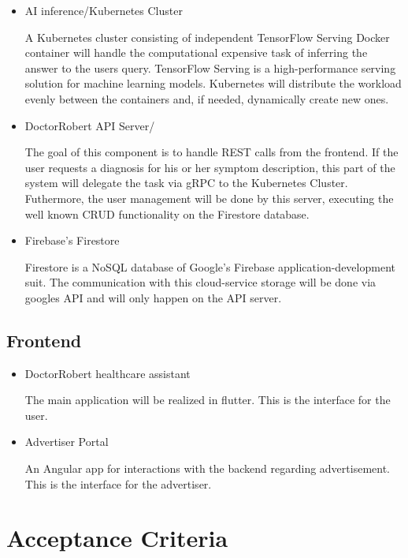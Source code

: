 \documentclass[12pt]{article}
\theoremstyle{definition}
\begin{document}
\begin{itemize}
    \item AI inference/Kubernetes Cluster
    
    A Kubernetes cluster consisting of independent TensorFlow Serving Docker container will handle the computational expensive task of inferring the answer to the users query. TensorFlow Serving is a high-performance serving solution for machine learning models. Kubernetes will distribute the workload evenly between the containers and, if needed, dynamically create new ones. 
    
    \item DoctorRobert API Server/
    
    The goal of this component is to handle REST calls from the frontend. If the user requests a diagnosis for his or her symptom description, this part of the system will delegate the task via gRPC to the Kubernetes Cluster. Futhermore, the user management will be done by this server, executing the well known CRUD functionality on the Firestore database.
    
    \item Firebase's Firestore
    
    Firestore is a NoSQL database of Google's Firebase application-development suit. The communication with this cloud-service storage will be done via googles API and will only happen on the API server.
    
\end{itemize}

\subsection{Frontend}

\begin{itemize}
    \item DoctorRobert healthcare assistant
    
    The main application will be realized in flutter. This is the interface for the user.
    
    \item Advertiser Portal
    
    An Angular app for interactions with the backend regarding advertisement. This is the interface for the advertiser.
\end{itemize}

\pagebreak

\section{Acceptance Criteria}
\end{document}
